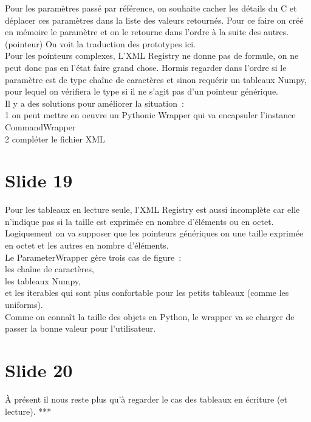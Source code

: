 \documentclass[12pt]{article}
\begin{document}
\noindent%
Pour les paramètres passé par référence, on souhaite cacher les détails du C et déplacer ces
paramètres dans la liste des valeurs retournés. Pour ce faire on créé en mémoire le paramètre et on
le retourne dans l'ordre à la suite des autres. (pointeur) On voit la traduction des prototypes ici. \\

\noindent%
Pour les pointeurs complexes, L'XML Registry ne donne pas de formule, on ne peut donc pas en l'état
faire grand chose. Hormis regarder dans l'ordre si le paramètre est de type chaîne de caractères et
sinon requérir un tableaux Numpy, pour lequel on vérifiera le type si il ne s'agit pas d'un pointeur
générique. \\

\noindent%
Il y a des solutions pour améliorer la situation~: \\
 1 on peut mettre en oeuvre un Pythonic Wrapper qui va encapsuler l'instance CommandWrapper \\
 2 compléter le fichier XML

\section{Slide 19}

\noindent%
Pour les tableaux en lecture seule, l'XML Registry est aussi incomplète car elle n'indique pas si la
taille est exprimée en nombre d'éléments ou en octet. \\

\noindent%
Logiquement on va supposer que les pointeurs génériques on une taille exprimée en octet et les
autres en nombre d'éléments. \\

\noindent%
Le ParameterWrapper gère trois cas de figure~: \\
  les chaîne de caractères, \\
  les tableaux Numpy, \\
  et les iterables qui sont plus confortable pour les petits tableaux (comme les uniforms). \\

\noindent%
Comme on connaît la taille des objets en Python, le wrapper va se charger de passer la bonne valeur
pour l'utilisateur.

\section{Slide 20}

\noindent%
À présent il nous reste plus qu'à regarder le cas des tableaux en écriture (et lecture). *** \\
\end{document}
